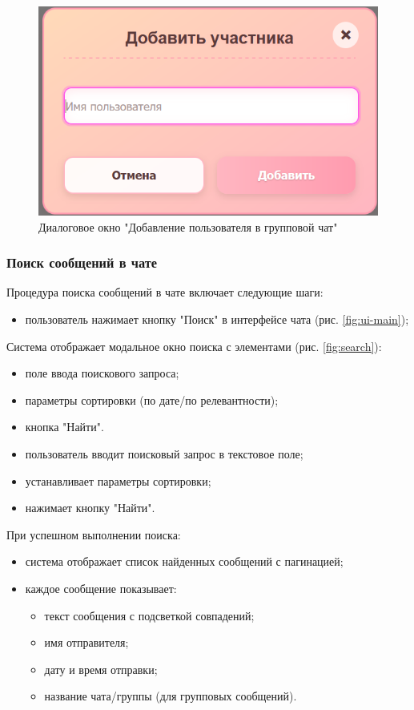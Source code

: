 \begin{figure}[!h]
	\centering
	\includegraphics[width=0.8\linewidth]{"images/Окно добавления участника"}
	\caption{Диалоговое окно "Добавление пользователя в групповой чат"}
	\label{fig:add-user}
\end{figure}

\subsubsection{Поиск сообщений в чате}
Процедура поиска сообщений в чате включает следующие шаги:

\begin{itemize}
	\item пользователь нажимает кнопку "Поиск" в интерфейсе чата (рис. \ref{fig:ui-main});
\end{itemize}

Система отображает модальное окно поиска с элементами (рис. \ref{fig:search}):
\begin{itemize}
	\item поле ввода поискового запроса;
	\item параметры сортировки (по дате/по релевантности);
	\item кнопка "Найти".
\end{itemize}

\begin{itemize}
	\item пользователь вводит поисковый запрос в текстовое поле;
	\item устанавливает параметры сортировки;
	\item нажимает кнопку "Найти".
\end{itemize}

При успешном выполнении поиска:
\begin{itemize}
	\item система отображает список найденных сообщений с пагинацией;
	\item каждое сообщение показывает:
	\begin{itemize}
		\item текст сообщения с подсветкой совпадений;
		\item имя отправителя;
		\item дату и время отправки;
		\item название чата/группы (для групповых сообщений).
	\end{itemize}
\end{itemize}

